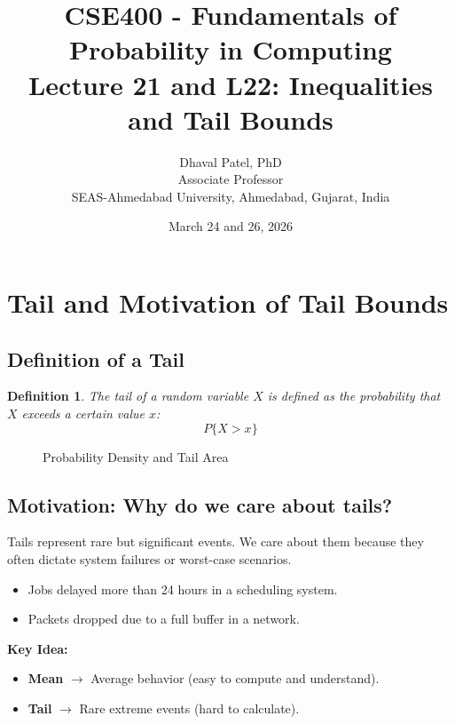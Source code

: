 \documentclass{article}
\title{\textbf{CSE400 - Fundamentals of Probability in Computing} \\ \Large Lecture 21 and L22: Inequalities and Tail Bounds}
\author{Dhaval Patel, PhD \\ \small Associate Professor \\ \small SEAS-Ahmedabad University, Ahmedabad, Gujarat, India}
\date{March 24 and 26, 2026}
\newtheorem{definition}{Definition}
\begin{document}
\maketitle

\tableofcontents
\newpage

\section{Tail and Motivation of Tail Bounds}

\subsection{Definition of a Tail}
\begin{definition}
The tail of a random variable $X$ is defined as the probability that $X$ exceeds a certain value $x$:
\[ P\{X > x\} \]
\end{definition}

\begin{figure}[h]
    \centering
    \caption{Probability Density and Tail Area}
\end{figure}

\subsection{Motivation: Why do we care about tails?}
Tails represent rare but significant events. We care about them because they often dictate system failures or worst-case scenarios.
\begin{itemize}
    \item Jobs delayed more than 24 hours in a scheduling system.
    \item Packets dropped due to a full buffer in a network.
\end{itemize}

\textbf{Key Idea:}
\begin{itemize}
    \item \textbf{Mean} $\rightarrow$ Average behavior (easy to compute and understand).
    \item \textbf{Tail} $\rightarrow$ Rare extreme events (hard to calculate).
\end{itemize}
\end{document}
